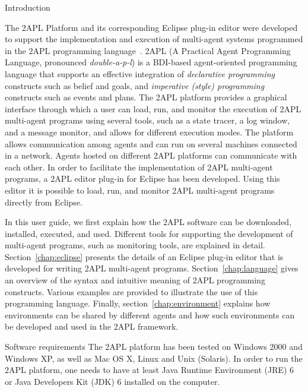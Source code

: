 \begin{chapter}{Introduction}
\label{chap:introduction}

The 2APL Platform and its corresponding Eclipse plug-in editor were
developed to support the implementation and execution of multi-agent
systems programmed in the 2APL programming
language~\cite{Dastani:08a,D-RULECHP09,CLIMA09}. 2APL (A Practical
Agent Programming Language, pronounced \emph{double-a-p-l}) is a
BDI-based agent-oriented programming language that supports an
effective integration of \emph{declarative programming} constructs
such as belief and goals, and \emph{imperative (style) programming}
constructs such as events and plans. The 2APL platform provides a
graphical interface through which a user can load, run, and monitor
the execution of 2APL multi-agent programs using several tools, such
as a state tracer, a log window, and a message monitor, and allows
for different execution modes. The platform allows communication
among agents and can run on several machines connected in a network.
Agents hosted on different 2APL platforms can communicate with each
other. In order to facilitate the implementation of 2APL multi-agent
programs, a 2APL editor plug-in for Eclipse has been developed.
Using this editor it is possible to load, run, and monitor 2APL
multi-agent programs directly from Eclipse.

In this user guide, we first explain how the 2APL software can be
downloaded, installed, executed, and used. Different tools for
supporting the development of multi-agent programs, such as
monitoring tools, are explained in detail.
Section~\ref{chap:eclipse} presents the details of an Eclipse
plug-in editor that is developed for writing 2APL multi-agent
programs. Section~\ref{chap:language} gives an overview of the
syntax and intuitive meaning of 2APL programming constructs. Various
examples are provided to illustrate the use of this programming
language. Finally, section~\ref{chap:environment} explains how
environments can be shared by different agents and how such
environments can be developed and used in the 2APL framework.

\begin{section}{Software requirements}
The 2APL platform has been tested on Windows 2000 and Windows XP, as
well as Mac OS X, Linux and Unix (Solaris). In order to run the 2APL
platform, one needs to have at least Java Runtime Environment (JRE)
6 or Java Developers Kit (JDK) 6 installed on the computer.
\end{section}


\end{chapter}
